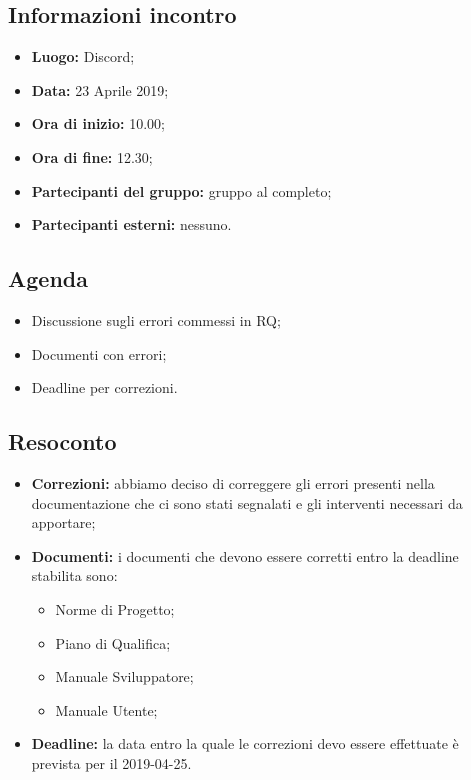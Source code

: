 \subsection{Informazioni incontro}
\begin{itemize}
	\item { \textbf{Luogo:} Discord};
	\item { \textbf{Data:} 23 Aprile 2019};
	\item { \textbf{Ora di inizio:} 10.00};
	\item { \textbf{Ora di fine:} 12.30};
	\item { \textbf{Partecipanti del gruppo:} gruppo al completo};
	\item { \textbf{Partecipanti esterni:} nessuno}.
\end{itemize}


\subsection{Agenda}
\begin{itemize}
	\item {Discussione sugli errori commessi in RQ;}
	\item {Documenti con errori;}
	\item {Deadline per correzioni.}
\end{itemize}

\subsection{Resoconto}
\begin{itemize}
	\item { \textbf{Correzioni:} abbiamo deciso di correggere gli errori presenti nella documentazione che ci sono stati segnalati e gli interventi necessari da apportare;}
	\item{ \textbf{Documenti:} i documenti che devono essere corretti entro la deadline stabilita sono:
		\begin{itemize}
			\item Norme di Progetto;
			\item Piano di Qualifica;
			\item Manuale Sviluppatore;
			\item Manuale Utente;
		\end{itemize}}
	\item {\textbf{Deadline:} la data entro la quale le correzioni devo essere effettuate è prevista per il 2019-04-25.}
\end{itemize}

